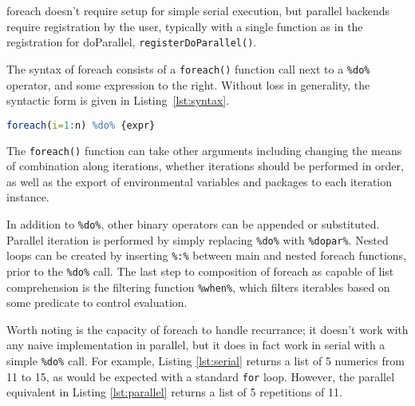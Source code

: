 \documentclass[a4paper,10pt]{article}
\begin{document}
foreach doesn't require setup for simple serial execution, but
parallel backends require registration by the user, typically with a
single function as in the registration for doParallel,
\texttt{registerDoParallel()}.

The syntax of foreach consists of a \texttt{foreach()} function call
next to a \texttt{\%do\%} operator, and some expression to the
right\cite{weston19:_using}. Without loss in generality, the syntactic
form is given in Listing~\ref{lst:syntax}.
\begin{lstlisting}[caption={Standard foreach syntax},label=lst:syntax,language=R]
foreach(i=1:n) %do% {expr}
\end{lstlisting}

The \texttt{foreach()} function can take other arguments including
changing the means of combination along iterations, whether iterations
should be performed in order, as well as the export of environmental
variables and packages to each iteration instance.

In addition to \texttt{\%do\%}, other binary operators can be appended
or substituted. Parallel iteration is performed by simply replacing
\texttt{\%do\%} with \texttt{\%dopar\%}. Nested loops can be created
by inserting \texttt{\%:\%} between main and nested foreach functions,
prior to the \texttt{\%do\%} call\cite{weston19:_nestin_loops}. The
last step to composition of foreach as capable of list comprehension
is the filtering function \texttt{\%when\%}, which filters iterables
based on some predicate to control evaluation.

Worth noting is the capacity of foreach to handle recurrance; it
doesn't work with any naive implementation in parallel, but it does in
fact work in serial with a simple \texttt{\%do\%} call. For example,
Listing \ref{lst:serial} returns a list of 5 numerics from 11 to 15,
as would be expected with a standard \texttt{for} loop. However, the
parallel equivalent in Listing \ref{lst:parallel} returns a list of 5
repetitions of 11.
\end{document}
